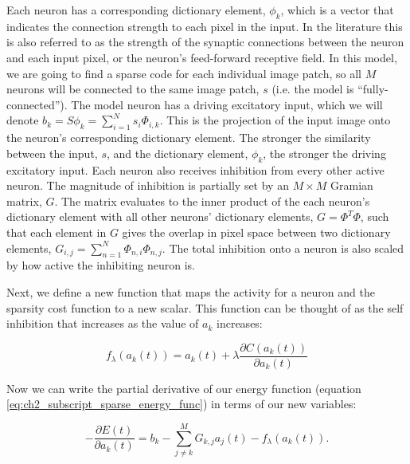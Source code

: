 Each neuron has a corresponding dictionary element, $\phi_{k}$, which is a vector that indicates the connection strength to each pixel in the input. In the literature this is also referred to as the strength of the synaptic connections between the neuron and each input pixel, or the neuron's feed-forward receptive field. In this model, we are going to find a sparse code for each individual image patch, so all $M$ neurons will be connected to the same image patch, $s$ (i.e. the model is ``fully-connected''). The model neuron has a driving excitatory input, which we will denote $b_{k} = S\phi_{k} = \sum_{i=1}^{N}s_{i} \Phi_{i,k}$. This is the projection of the input image onto the neuron's corresponding dictionary element. The stronger the similarity between the input, $s$, and the dictionary element, $\phi_{k}$, the stronger the driving excitatory input. Each neuron also receives inhibition from every other active neuron. The magnitude of inhibition is partially set by an $M \times M$ Gramian matrix, $G$. The matrix evaluates to the inner product of the each neuron's dictionary element with all other neurons' dictionary elements, $G = \Phi^T\Phi$, such that each element in $G$ gives the overlap in pixel space between two dictionary elements, $G_{i,j} = \sum\limits_{n=1}^{N} \Phi_{n,i}\Phi_{n,j}$. The total inhibition onto a neuron is also scaled by how active the inhibiting neuron is.

Next, we define a new function that maps the activity for a neuron and the sparsity cost function to a new scalar. This function can be thought of as the self inhibition that increases as the value of $a_{k}$ increases:

\begin{equation}\label{eq:ch2_hopfield_t_func}
  f_{\lambda}(a_{k}(t)) = a_{k}(t) + \lambda \frac{\partial C(a_{k}(t))}{\partial a_{k}(t)}
\end{equation}

Now we can write the partial derivative of our energy function (equation \eqref{eq:ch2_subscript_sparse_energy_func}) in terms of our new variables:

\begin{equation}\label{eq:ch2_lca_deda_simple}
    - \frac{\partial E(t)}{\partial a_{k}(t)} =
    b_{k} -
    \sum\limits_{j \neq k}^{M} G_{k,j} a_{j}(t) -
    f_{\lambda}(a_{k}(t)).
\end{equation}


